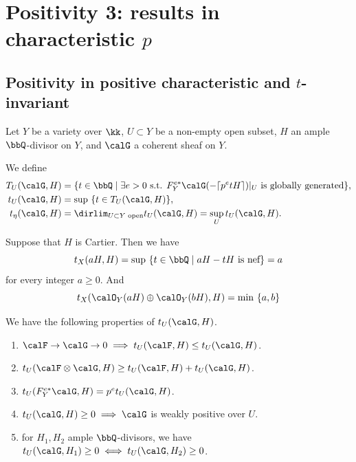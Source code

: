 \section[Positivity 3: results in characteristic p]{Positivity 3: results in characteristic $p$}

\subsection[Positivity in positive characteristic and t-invariant]{Positivity in positive characteristic and $t$-invariant}

Let $Y$ be a variety over $\kk$, $U \subset Y$ be a non-empty open subset, $H$ an ample $\bbQ$-divisor on $Y$, and $\calG$ a coherent sheaf on $Y$.
\begin{definition}
	We define
	\begin{align*}
		T_U(\calG,H)    & = \{t \in \bbQ \mid \exists e > 0 \text{ s.t. } F_Y^{e*} \calG(-\lceil p^e t H \rceil)|_U \text{ is globally generated}\}, \\
		t_U(\calG,H)    & = \sup\ \{t \in T_U(\calG,H)\},                                                                                            \\
		t_\eta(\calG,H) & = \dirlim_{U \subset Y \text{ open}} t_U(\calG,H) = \sup_U t_U(\calG,H).
	\end{align*}
\end{definition}

\begin{example}
	Suppose that $H$ is Cartier.
	Then we have
	\[ t_X(aH,H) = \sup\ \{t \in \bbQ \mid aH - tH \text{ is nef}\} = a \]
	for every integer $a \geq 0$.
	And
	\[ t_X(\calO_Y(aH)\oplus \calO_Y(bH),H) = \min\ \{a,b\} \]
\end{example}


\begin{proposition}
	We have the following properties of $t_U(\calG,H)$.
	\begin{enumerate}
		\item $\calF \to \calG \to 0 \implies t_U(\calF,H) \leq t_U(\calG,H)$.
		\item $t_U(\calF \otimes \calG,H) \geq t_U(\calF,H) + t_U(\calG,H)$.
		\item $t_U(F_Y^{e*}\calG,H) = p^e t_U(\calG,H)$.
		\item $t_U(\calG,H) \geq 0 \implies \calG$ is weakly positive over $U$.\Yang{}
		\item for $H_1,H_2$ ample $\bbQ$-divisors, we have $t_U(\calG,H_1) \geq 0 \iff t_U(\calG,H_2) \geq 0$.
	\end{enumerate}
\end{proposition}

